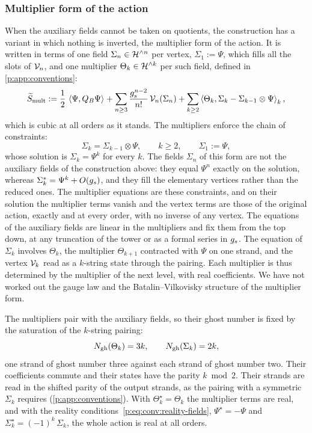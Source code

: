 \subsubsection{Multiplier form of the action}
\label{p:sec:all:multiplier}

When the auxiliary fields cannot be taken on quotients, the construction has a variant in which nothing is inverted, the multiplier form of the action.
  It is written in terms of one field $\Sigma_n \in \Hn{n}$ per vertex, $\Sigma_1 := \Psi$, which fills all the slots of $\vertex{n}$, and one multiplier $\Theta_k \in \Hn{k}$ per such field, defined in \cref{p:app:conventions}:
  \begin{equation}
  \label{p:eq:all:multiplier-action}
  \caction[\mathrm{mult}]
    := \frac{1}{2} \, \pair{\Psi}{Q_B \Psi}
      + \sum_{n \ge 3} \frac{\gs^{n - 2}}{n!} \, \vertex{n}(\Sigma_n)
      + \sum_{k \ge 2} \pair[k]{\Theta_k}{\Sigma_k - \Sigma_{k - 1} \otimes \Psi},
\end{equation}
  which is cubic at all orders as it stands.
  The multipliers enforce the chain of constraints:
\begin{equation}
  \label{p:eq:all:constraints}
  \Sigma_k
    = \Sigma_{k - 1} \otimes \Psi,
  \qquad
  k \ge 2,
  \qquad
  \Sigma_1
    := \Psi,
\end{equation}
whose solution is $\Sigma_k = \Psi^k$ for every $k$.
The fields $\Sigma_n$ of this form are not the auxiliary fields of the construction above: they equal $\Psi^n$ exactly on the solution, whereas $\Sigma_k^* = \Psi^k + O(\gs)$, and they fill the elementary vertices rather than the reduced ones.
The multiplier equations are these constraints, and on their solution the multiplier terms vanish and the vertex terms are those of the original action, exactly and at every order, with no inverse of any vertex.
The equations of the auxiliary fields are linear in the multipliers and fix them from the top down, at any truncation of the tower or as a formal series in $\gs$.
The equation of $\Sigma_k$ involves $\Theta_k$, the multiplier $\Theta_{k + 1}$ contracted with $\Psi$ on one strand, and the vertex $\vertex{k}$ read as a $k$-string state through the pairing.
Each multiplier is thus determined by the multiplier of the next level, with real coefficients.
We have not worked out the gauge law and the Batalin--Vilkovisky structure of the multiplier form.

The multipliers pair with the auxiliary fields, so their ghost number is fixed by the saturation of the $k$-string pairing:
\begin{equation}
  \label{p:eq:all:ghost-multiplier}
  \Ngh(\Theta_k)
    = 3 k,
  \qquad
  \Ngh(\Sigma_k)
    = 2 k,
\end{equation}
one strand of ghost number three against each strand of ghost number two.
Their coefficients commute and their states have the parity $k \bmod 2$.
Their strands are read in the shifted parity of the output strands, as the pairing with a symmetric $\Sigma_k$ requires (\cref{p:app:conventions}).
With $\Theta_k^\star = \Theta_k$ the multiplier terms are real, and with the reality conditions~\eqref{p:eq:conv:reality-fields}, $\Psi^\star = - \Psi$ and $\Sigma_k^\star = (-1)^k \, \Sigma_k$, the whole action is real at all orders.


